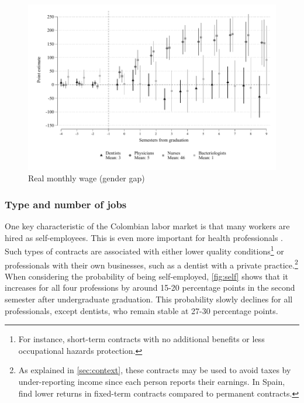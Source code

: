 \documentclass[12pt, a4paper]{article}
\begin{document}
\begin{figure}[H]
\caption{Real monthly wage (gender gap)}\label{fig:wage_gap}
\centering 
\includegraphics[width=\textwidth]{Figures/Callaway SantAnna/ES_pila_salario_r_0_gap.pdf}
\end{figure}

\subsubsection{Type and number of jobs}

One key characteristic of the Colombian labor market is that many workers are hired as self-employees. This is even more important for health professionals \citep{Procuraduria2020}. Such types of contracts are associated with either lower quality conditions\footnote{For instance, short-term contracts with no additional benefits or less occupational hazards protection.} or professionals with their own businesses, such as a dentist with a private practice.\footnote{As explained in \autoref{sec:context}, these contracts may be used to avoid taxes by under-reporting income since each person reports their earnings. In Spain, \citet{garcia2023dual} find lower returns in fixed-term contracts compared to permanent contracts.} When considering the probability of being self-employed, \autoref{fig:self} shows that it increases for all four professions by around 15-20 percentage points in the second semester after undergraduate graduation. This probability slowly declines for all professionals, except dentists, who remain stable at 27-30 percentage points. 
\end{document}
